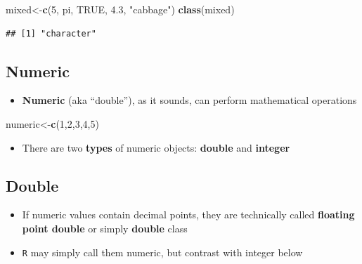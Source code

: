 \documentclass[]{book}
\newenvironment{Shaded}{\begin{snugshade}}{\end{snugshade}}
\newcommand{\KeywordTok}[1]{\textcolor[rgb]{0.13,0.29,0.53}{\textbf{#1}}}
\newcommand{\DecValTok}[1]{\textcolor[rgb]{0.00,0.00,0.81}{#1}}
\newcommand{\FloatTok}[1]{\textcolor[rgb]{0.00,0.00,0.81}{#1}}
\newcommand{\StringTok}[1]{\textcolor[rgb]{0.31,0.60,0.02}{#1}}
\newcommand{\OtherTok}[1]{\textcolor[rgb]{0.56,0.35,0.01}{#1}}
\newcommand{\NormalTok}[1]{#1}
\providecommand{\tightlist}{%
  \setlength{\itemsep}{0pt}\setlength{\parskip}{0pt}}
\theoremstyle{definition}
\theoremstyle{definition}
\theoremstyle{definition}
\theoremstyle{remark}
\begin{document}
\begin{Shaded}
\begin{Highlighting}[]
\NormalTok{mixed<-}\KeywordTok{c}\NormalTok{(}\DecValTok{5}\NormalTok{, pi, }\OtherTok{TRUE}\NormalTok{, }\FloatTok{4.3}\NormalTok{, }\StringTok{"cabbage"}\NormalTok{)}
\KeywordTok{class}\NormalTok{(mixed)}
\end{Highlighting}
\end{Shaded}

\begin{verbatim}
## [1] "character"
\end{verbatim}

\subsection{Numeric}\label{numeric}

\begin{itemize}
\tightlist
\item
  \textbf{Numeric} (aka ``double''), as it sounds, can perform
  mathematical operations
\end{itemize}

\begin{Shaded}
\begin{Highlighting}[]
\NormalTok{numeric<-}\KeywordTok{c}\NormalTok{(}\DecValTok{1}\NormalTok{,}\DecValTok{2}\NormalTok{,}\DecValTok{3}\NormalTok{,}\DecValTok{4}\NormalTok{,}\DecValTok{5}\NormalTok{)}
\end{Highlighting}
\end{Shaded}

\begin{itemize}
\tightlist
\item
  There are two \textbf{types} of numeric objects: \textbf{double} and
  \textbf{integer}
\end{itemize}

\subsection{Double}\label{double}

\begin{itemize}
\tightlist
\item
  If numeric values contain decimal points, they are technically called
  \textbf{floating point double} or simply \textbf{double} class
\item
  \texttt{R} may simply call them numeric, but contrast with integer
  below
\end{itemize}
\end{document}
